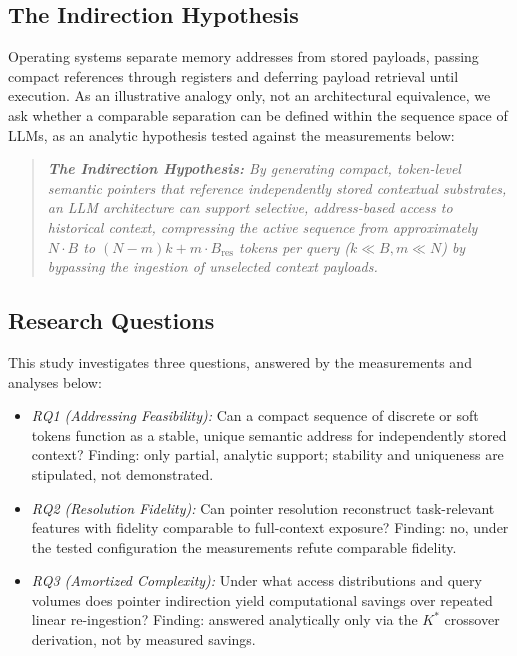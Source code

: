 \documentclass[runningheads]{llncs}
\begin{document}
\subsection{The Indirection Hypothesis}
Operating systems separate memory addresses from stored payloads, passing compact references through registers and deferring payload retrieval until execution. As an illustrative analogy only, not an architectural equivalence, we ask whether a comparable separation can be defined within the sequence space of LLMs, as an analytic hypothesis tested against the measurements below:
\begin{quote}\itshape\small
\textbf{The Indirection Hypothesis:} By generating compact, token-level semantic pointers that reference independently stored contextual substrates, an LLM architecture can support selective, address-based access to historical context, compressing the active sequence from approximately $N \cdot B$ to $(N-m)k + m \cdot B_{\mathrm{res}}$ tokens per query ($k \ll B, m \ll N$) by bypassing the ingestion of unselected context payloads.
\end{quote}

\subsection{Research Questions}
This study investigates three questions, answered by the measurements and analyses below:
\begin{itemize}\setlength{\itemsep}{0.5pt}\setlength{\parsep}{0pt}\setlength{\parskip}{0pt}\setlength{\topsep}{1.5pt}
    \item \textit{RQ1 (Addressing Feasibility):} Can a compact sequence of discrete or soft tokens function as a stable, unique semantic address for independently stored context? Finding: only partial, analytic support; stability and uniqueness are stipulated, not demonstrated.
    \item \textit{RQ2 (Resolution Fidelity):} Can pointer resolution reconstruct task-relevant features with fidelity comparable to full-context exposure? Finding: no, under the tested configuration the measurements refute comparable fidelity.
    \item \textit{RQ3 (Amortized Complexity):} Under what access distributions and query volumes does pointer indirection yield computational savings over repeated linear re-ingestion? Finding: answered analytically only via the $K^*$ crossover derivation, not by measured savings.
\end{itemize}
\end{document}
